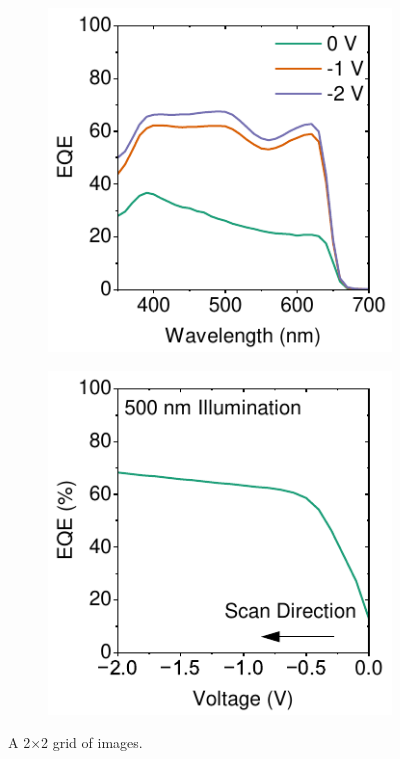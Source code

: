 \begin{figure}[ht!]
    \begin{subfigure}{0.4\textwidth}
        \centering
        \includegraphics[width=\textwidth]{chapters/transport_layers/images/AP40_4_EQE.pdf}
        \caption{}
        \label{}
    \end{subfigure}
    \hspace{0.5cm}
    \begin{subfigure}{0.4\textwidth}
        \centering
        \includegraphics[width=\textwidth]{chapters/transport_layers/images/AP40_4_EQE_fV.pdf}
        \caption{}
        \label{}
    \end{subfigure}
    
    \caption{A 2×2 grid of images.}
    \label{fig:pix_pepd:cross_section_performance}
\end{figure}

